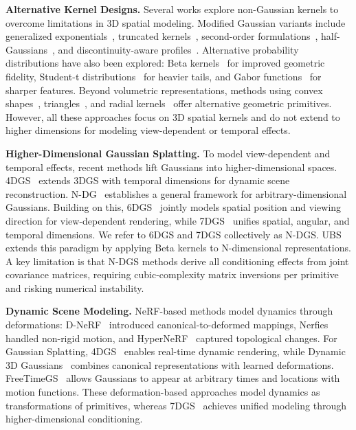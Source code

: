 \documentclass{article}
\theoremstyle{plain}
\theoremstyle{definition}
\theoremstyle{remark}
\begin{document}
\textbf{Alternative Kernel Designs.}
Several works explore non-Gaussian kernels to overcome limitations in 3D spatial modeling. Modified Gaussian variants include generalized exponentials~\cite{hamdi2024gesgeneralizedexponentialsplatting}, truncated kernels~\cite{liu2025tnt}, second-order formulations~\cite{zhang2025quadratic}, half-Gaussians~\cite{li20253d}, and discontinuity-aware profiles~\cite{qu2024disc}. Alternative probability distributions have also been explored: Beta kernels~\cite{liu2025deformable} for improved geometric fidelity, Student-t distributions~\cite{zhu20253dstudentsplattingscooping} for heavier tails, and Gabor functions~\cite{zhou20253dgabsplat3dgaborsplatting} for sharper features. Beyond volumetric representations, methods using convex shapes~\cite{held20243dconvexsplattingradiance}, triangles~\cite{held2025triangle}, and radial kernels~\cite{huang2025deformable} offer alternative geometric primitives. However, all these approaches focus on 3D spatial kernels and do not extend to higher dimensions for modeling view-dependent or temporal effects.

\textbf{Higher-Dimensional Gaussian Splatting.}
To model view-dependent and temporal effects, recent methods lift Gaussians into higher-dimensional spaces. 4DGS~\cite{yang2023real} extends 3DGS with temporal dimensions for dynamic scene reconstruction. N-DG~\cite{diolatzis2024n} establishes a general framework for arbitrary-dimensional Gaussians. Building on this, 6DGS~\cite{gao20246dgs} jointly models spatial position and viewing direction for view-dependent rendering, while 7DGS~\cite{gao20257dgs} unifies spatial, angular, and temporal dimensions. We refer to 6DGS and 7DGS collectively as N-DGS. UBS~\citep{liu2025universal} extends this paradigm by applying Beta kernels to N-dimensional representations. A key limitation is that N-DGS methods derive all conditioning effects from joint covariance matrices, requiring cubic-complexity matrix inversions per primitive and risking numerical instability.

\textbf{Dynamic Scene Modeling.}
NeRF-based methods model dynamics through deformations: D-NeRF~\cite{pumarola2020dnerfneuralradiancefields} introduced canonical-to-deformed mappings, Nerfies~\cite{park2021nerfies} handled non-rigid motion, and HyperNeRF~\cite{park2021hypernerf} captured topological changes. For Gaussian Splatting, 4DGS~\cite{yang2023real} enables real-time dynamic rendering, while Dynamic 3D Gaussians~\cite{luiten2023dynamic} combines canonical representations with learned deformations. FreeTimeGS~\cite{wang2025freetimegs} allows Gaussians to appear at arbitrary times and locations with motion functions. These deformation-based approaches model dynamics as transformations of primitives, whereas 7DGS~\cite{gao20257dgs} achieves unified modeling through higher-dimensional conditioning.
\end{document}
